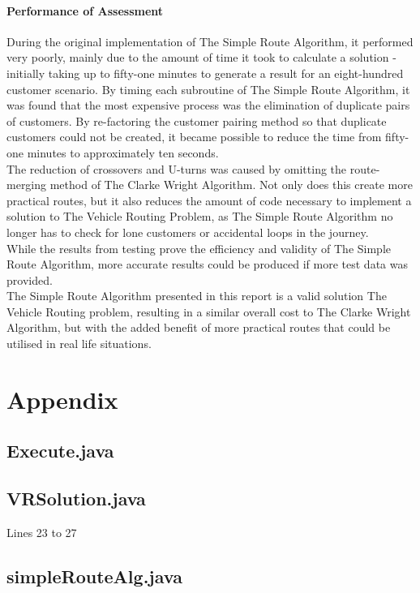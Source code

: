 \documentclass[conference]{acmsiggraph}
\begin{document}
		\paragraph{Performance of Assessment}
		During the original implementation of The Simple Route Algorithm, it performed very poorly, mainly due to the amount of time it took to calculate a solution - initially taking up to fifty-one minutes to generate a result for an eight-hundred customer scenario. By timing each subroutine of The Simple Route Algorithm, it was found that the most expensive process was the elimination of duplicate pairs of customers. By re-factoring the customer pairing method so that duplicate customers could not be created, it became possible to reduce the time from fifty-one minutes to approximately ten seconds.\\
		The reduction of crossovers and U-turns was caused by omitting the route-merging method of The Clarke Wright Algorithm. Not only does this create more practical routes, but it also reduces the amount of code necessary to implement a solution to The Vehicle Routing Problem, as The Simple Route Algorithm no longer has to check for lone customers or accidental loops in the journey.\\
		While the results from testing prove the efficiency and validity of The Simple Route Algorithm, more accurate results could be produced if more test data was provided.\\
		The Simple Route Algorithm presented in this report is a valid solution The Vehicle Routing problem, resulting in a similar overall cost to The Clarke Wright Algorithm, but with the added benefit of more practical routes that could be utilised in real life situations.
		 	
	\section{Appendix}
	
		\subsection{Execute.java}
		

		\subsection{VRSolution.java}
		Lines 23 to 27
		
		
		\subsection{simpleRouteAlg.java}
		
		
		
		
		
			
\end{document}
